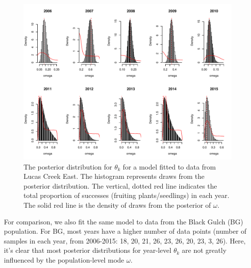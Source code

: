 \documentclass[12pt, oneside, titlepage]{article}   	%
\begin{document}
 \begin{figure}[h]
   \centering
       \includegraphics[page=1,width=.9\textwidth]{../figures/appendix-x-hierarchical}  
    \caption{ The posterior distribution for $\theta_k$ for a model fitted to data from Lucas Creek East. The histogram represents draws from the posterior distribution. The vertical, dotted red line indicates the total proportion of successes (fruiting plants/seedlings) in each year. The solid red line is the density of draws from the posterior of $\omega$. }
 \label{fig:hierarchical-1}
\end{figure}

For comparison, we also fit the same model to data from the Black Gulch (BG) population. For BG, most years have a higher number of data points (number of samples in each year, from 2006-2015: 18, 20, 21, 26, 23, 26, 20, 23, 3, 26). Here, it's clear that most posterior distributions for year-level $\theta_k$ are not greatly influenced by the population-level mode $\omega$. 
\end{document}
